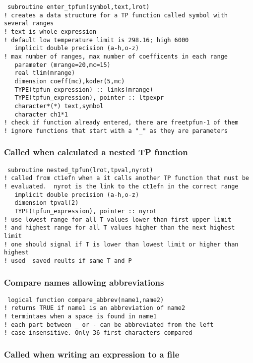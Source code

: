 \documentclass[12pt]{article}
\begin{document}
\begin{verbatim}
 subroutine enter_tpfun(symbol,text,lrot)
! creates a data structure for a TP function called symbol with several ranges
! text is whole expression
! default low temperature limit is 298.16; high 6000
   implicit double precision (a-h,o-z)
! max number of ranges, max number of coefficents in each range
   parameter (mrange=20,mc=15)
   real tlim(mrange)
   dimension coeff(mc),koder(5,mc)
   TYPE(tpfun_expression) :: links(mrange)
   TYPE(tpfun_expression), pointer :: ltpexpr
   character*(*) text,symbol
   character ch1*1
! check if function already entered, there are freetpfun-1 of them
! ignore functions that start with a "_" as they are parameters
\end{verbatim}

\subsubsection{Called when calculated a nested TP function}

\begin{verbatim}
 subroutine nested_tpfun(lrot,tpval,nyrot)
! called from ct1efn when a it calls another TP function that must be
! evaluated.  nyrot is the link to the ct1efn in the correct range
   implicit double precision (a-h,o-z)
   dimension tpval(2)
   TYPE(tpfun_expression), pointer :: nyrot
! use lowest range for all T values lower than first upper limit
! and highest range for all T values higher than the next highest limit
! one should signal if T is lower than lowest limit or higher than highest
! used  saved reults if same T and P
\end{verbatim}

\subsubsection{Compare names allowing abbreviations}

\begin{verbatim}
 logical function compare_abbrev(name1,name2)
! returns TRUE if name1 is an abbreviation of name2
! termintaes when a space is found in name1
! each part between _ or - can be abbreviated from the left
! case insensitive. Only 36 first characters compared
\end{verbatim}

\subsubsection{Called when writing an expression to a file}
\end{document}
